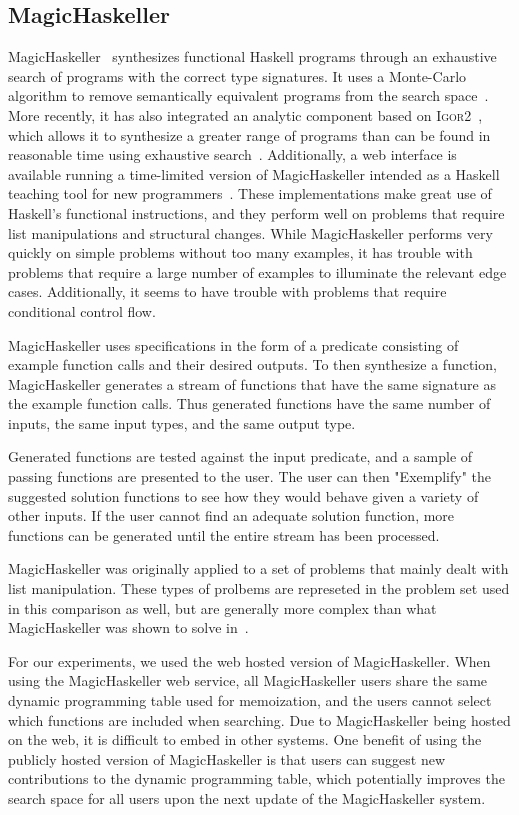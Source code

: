 \subsection{MagicHaskeller}

MagicHaskeller~\cite{katayama2010,Katayama05} synthesizes functional Haskell programs through an exhaustive search of programs with the correct type signatures. It uses a Monte-Carlo algorithm to remove semantically equivalent programs from the search space~\cite{Katayama2008}. More recently, it has also integrated an analytic component based on \textsc{Igor2}~\cite{kitzelmann2011two}, which allows it to synthesize a greater range of programs than can be found in reasonable time using exhaustive search~\cite{katayama2011magichaskeller}. Additionally, a web interface is available running a time-limited version of MagicHaskeller intended as a Haskell teaching tool for new programmers~\cite{katayama2013}. These implementations make great use of Haskell's functional instructions, and they perform well on problems that require list manipulations and structural changes. While MagicHaskeller performs very quickly on simple problems without too many examples, it has trouble with problems that require a large number of examples to illuminate the relevant edge cases. Additionally, it seems to have trouble with problems that require conditional control flow.

MagicHaskeller uses specifications in the form of a predicate consisting of example function calls and their desired outputs. To then synthesize a function, MagicHaskeller generates a stream of functions that have the same signature as the example function calls. Thus generated functions have the same number of inputs, the same input types, and the same output type.

Generated functions are tested against the input predicate, and a sample of passing functions are presented to the user. The user can then "Exemplify" the suggested solution functions to see how they would behave given a variety of other inputs. If the user cannot find an adequate solution function, more functions can be generated until the entire stream has been processed.

MagicHaskeller was originally applied to a set of problems that mainly dealt with list manipulation. These types of prolbems are represeted in the problem set used in this comparison as well, but are generally more complex than what MagicHaskeller was shown to solve in~\cite{katayama2013}.

For our experiments, we used the web hosted version of MagicHaskeller. When using the MagicHaskeller web service, all MagicHaskeller users share the same dynamic programming table used for memoization, and the users cannot select which functions are included when searching. Due to MagicHaskeller being hosted on the web, it is difficult to embed in other systems. One benefit of using the publicly hosted version of MagicHaskeller is that users can suggest new contributions to the dynamic programming table, which potentially improves the search space for all users upon the next update of the MagicHaskeller system. 

